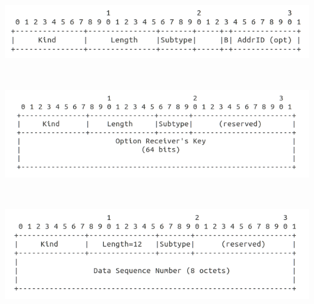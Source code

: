 \begin{minipage}[c]{\textwidth}

\includegraphics[width=\textwidth]{Figures/mpprioformat.png}
\end{minipage} \\

\begin{minipage}[c]{\textwidth}

\includegraphics[width=\textwidth]{Figures/mpfastformat.png}
\end{minipage} \\


\begin{minipage}[c]{\textwidth}

\includegraphics[width=\textwidth]{Figures/mpfailformat.png}
\end{minipage} \\

